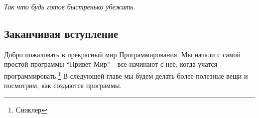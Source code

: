 \noindent
\emph{Так что будь готов быстренько убежать.}

\subsection*{\color{BrickRed}Заканчивая вступление}

Добро пожаловать в прекрасный мир Программирования.  Мы начали с самой простой программы ``Привет Мир''---все начинают с неё, когда учатся программировать.\footnote{Синклер}
В следующей главе мы будем делать более полезные вещи и посмотрим, как создаются программы.

\newpage